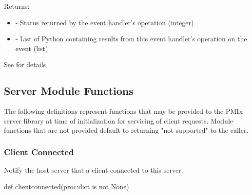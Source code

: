 \begin{arglist}
\end{arglist}

Returns:
\begin{itemize}
    \item {} - Status returned by the event handler's operation (integer)
    \item {} - List of Python  containing results from this event handler's operation on the event (list)
\end{itemize}

See  for details


\subsection{Server Module Functions}

The following definitions represent functions that may be provided to the \ac{PMIx} server library at time of initialization for servicing of client requests. Module functions that are not provided default to returning "not supported" to the caller.

\subsubsection{Client Connected}

\summary

Notify the host server that a client connected to this server.

\format

\pyspecificstart
\begin{codepar}
def clientconnected(proc:dict is not None)
\end{codepar}
\pyspecificend

\begin{arglist}
\end{arglist}

